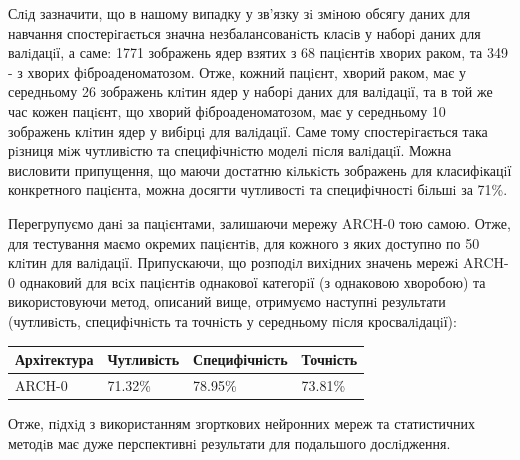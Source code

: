 Слiд зазначити, що в нашому випадку у зв'язку зi змiною обсягу даних для навчання спостерiгається значна незбалансованiсть класiв у наборi даних для валiдацiї, а саме: 1771 зображень ядер взятих з 68 пацiєнтiв хворих раком, та 349 - з хворих фiброаденоматозом. Отже, кожний пацiєнт, хворий раком, має у середньому 26 зображень клiтин ядер у наборi даних для валiдацiї, та в той же час кожен пацiєнт, що хворий фiброаденоматозом, має у середньому 10 зображень клiтин ядер у вибiрцi для валiдацiї. Саме тому спостерiгається така рiзниця мiж чутливiстю та специфiчнiстю моделi пiсля валiдацiї. Можна висловити припущення, що маючи достатню кiлькiсть зображень для класифiкацiї конкретного пацiєнта, можна досягти чутливостi та специфiчностi бiльшi за 71\%.

Перегрупуємо данi за пацiєнтами, залишаючи мережу ARCH-0 тою самою. Отже, для тестування маємо окремих пацiєнтiв, для кожного з яких доступно по 50 клiтин для валiдацiї. Припускаючи, що розподiл вихiдних значень мережi ARCH-0 однаковий для всiх пацiєнтiв однакової категорiї (з однаковою хворобою) та використовуючи метод, описаний вище, отримуємо наступнi результати (чутливiсть, специфiчнiсть та точнiсть у середньому пiсля кросвалiдацiї):

\begin{center}
	\begin{tabular}
		{| m{3cm} || m{3cm} | m{3cm} | m{3cm} |}
		\hline
		Архітектура & Чутливість & Специфічність & Точність \\ \hline \hline
		ARCH-0 & 71.32\%  & 78.95\%  & 73.81\%  \\ \hline
	\end{tabular}
\end{center}

Отже, пiдхiд з використанням згорткових нейронних мереж та статистичних методiв має дуже перспективнi результати для подальшого дослiдження.